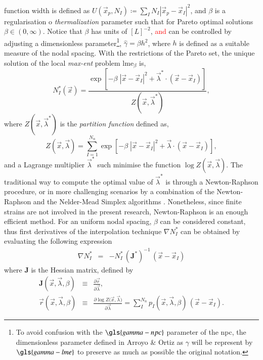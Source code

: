 \documentclass[preprint,12pt,a4paper]{elsarticle}
\newcommand{\tens}[1]{
  \ensuremath{\mathbf{{#1}}}
}
\begin{document}
function width is defined as $U(\vec{x}_p,N_I) \coloneqq
\sum_I N_I |\vec{x}_p - \vec{x}_I |^2$, and $\beta$ is a
regularisation o \textit{thermalization} parameter such that for
Pareto optimal solutions $\beta \in
(0,\infty)$. Notice that $\beta$ has units of $[L]^{-2}$,
\textcolor{red}{and} can be controlled by adjusting a dimensionless
parameter\footnote{To avoid confusion with the $\gls{gamma-npc}$ parameter of
  the \acrshort{npc}, the dimensionless parameter defined in Arroyo \&
  Ortiz \cite{Arroyo2006} as $\gamma$ will be represent by
  $\gls{gamma-lme}$ to preserve as much as possible the original notation.},
$\widehat{\gamma}=\beta h^2$, where $h$ is defined as a
suitable measure of the nodal spacing. With the restrictions of the
Pareto set, the unique solution of the local
\textit{max-ent} problem \acrshort{lme}$_\beta$ is,
 \begin{equation}
  \label{eq:LME-p}
N_I^*(\vec{x})=\frac{\exp\left[ -\beta \; |\vec{x}-\vec{x}_I|^2 +
    \vec{\lambda}^* \cdot (\vec{x}-\vec{x}_I) \right] } {Z(\vec{x},\vec{\lambda}^*)},
\end{equation}
where $Z(\vec{x},\vec{\lambda}^*)$ is the \textit{partition function} defined as,
\begin{equation}
  \label{eq:LME-Z}
Z(\vec{x}, {\vec{\lambda}}) = \sum_{I=1}^{N_n}{ \exp \left[ -\beta \; |\vec{x}-\vec{x}_I|^2 + \vec{\lambda} \cdot (\vec{x}-\vec{x}_I)  \right]},
\end{equation}
and a Lagrange multiplier $\vec{\lambda}^*$ such minimise the function $\log
Z(\vec{x}, \vec{\lambda})$.
The traditional way to compute the optimal value of $\vec{\lambda}^*$
is through a Newton-Raphson procedure, or in more challenging
scenarios by a combination of the Newton-Raphson and the Nelder-Mead
Simplex algorithms \cite{Navas2018a}. Nonetheless, since finite
strains are not involved in the present research, Newton-Raphson is an
enough efficient method. For an uniform nodal spacing, $\beta$ can be
considered constant, thus first derivatives of the interpolation technique $\nabla
N^*_I$ can be obtained 
by evaluating the following expression
\begin{eqnarray}
  \label{eq:LME-gradp} 
\nabla N^*_I &=& -N^*_I \,  (\tens{J}^*)^{-1} \,  (\vec{x} - \vec{x}_I)
\end{eqnarray}
where $\tens{J}$ is the Hessian matrix, defined by
\begin{eqnarray}
  \label{eq:LME-J} 
  \tens{J}(\vec{x}, \vec{\lambda},\beta) &\equiv& \frac{\partial
                                                  \vec{r}}{\partial \vec{\lambda}},\\
  \label{eq:LME-r}
  \vec{r}(\vec{x},\vec{\lambda},\beta) &\equiv& \frac{\partial \log{ Z(   \vec{x},\vec{\lambda}})}{\partial \vec{\lambda}}  = \sum_I^{N_n} p_I(\vec{x},\vec{\lambda},\beta) \, (\vec{x} - \vec{x}_I).
\end{eqnarray}
\end{document}
